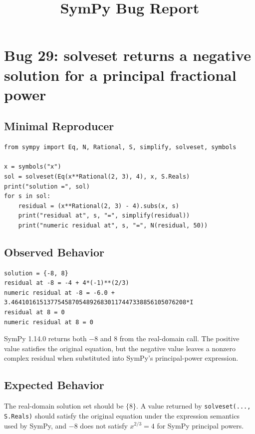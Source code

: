 \documentclass[11pt]{article}
\title{SymPy Bug Report}
\author{}
\date{}
\begin{document}
\maketitle

\section{Bug 29: solveset returns a negative solution for a principal fractional power}

\subsection{Minimal Reproducer}

\medskip

\begin{lstlisting}[style=bugpython]
from sympy import Eq, N, Rational, S, simplify, solveset, symbols

x = symbols("x")
sol = solveset(Eq(x**Rational(2, 3), 4), x, S.Reals)
print("solution =", sol)
for s in sol:
    residual = (x**Rational(2, 3) - 4).subs(x, s)
    print("residual at", s, "=", simplify(residual))
    print("numeric residual at", s, "=", N(residual, 50))
\end{lstlisting}

\subsection{Observed Behavior}

\medskip

\begin{lstlisting}[style=bugpython]
solution = {-8, 8}
residual at -8 = -4 + 4*(-1)**(2/3)
numeric residual at -8 = -6.0 + 3.4641016151377545870548926830117447338856105076208*I
residual at 8 = 0
numeric residual at 8 = 0
\end{lstlisting}

SymPy 1.14.0 returns both \(-8\) and \(8\) from the real-domain call. The positive value satisfies the original equation, but the negative value leaves a nonzero complex residual when substituted into SymPy's principal-power expression.

\subsection{Expected Behavior}

The real-domain solution set should be \(\{8\}\). A value returned by
\texttt{solveset(..., S.Reals)} should satisfy the original equation under the expression semantics used by SymPy, and \(-8\) does not satisfy \(x^{2/3}=4\) for SymPy principal powers.
\end{document}
